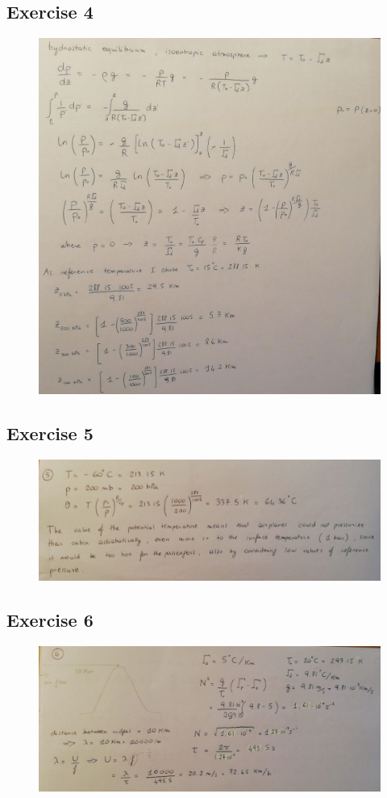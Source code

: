 \documentclass[11pt,a4paper]{article}
\begin{document}
\subsection{Exercise 4}
\begin{figure}[H]
	\centering \includegraphics[width=150mm]{images/es4.JPEG}
\end{figure}
\subsection{Exercise 5}
\begin{figure}[H]
	\centering \includegraphics[width=150mm]{images/es5.JPEG} 
\end{figure}
\subsection{Exercise 6}
\begin{figure}[H]
	\centering \includegraphics[width=150mm]{images/es6.JPEG}
\end{figure}
\end{document}
